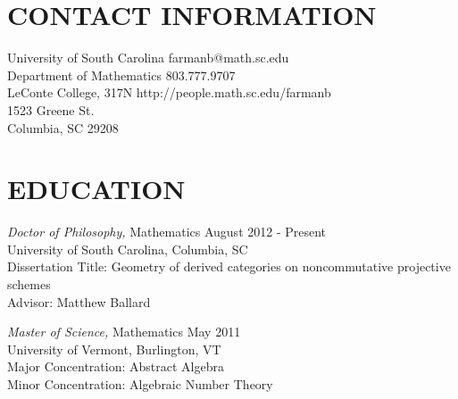 \documentclass[line,overlapped]{res}
\begin{document}

\begin{resume}
  
  
  \section{CONTACT INFORMATION}
  University of South Carolina \hfill farmanb@math.sc.edu\\
  Department of Mathematics \hfill 803.777.9707\\
  LeConte College, 317N \hfill http://people.math.sc.edu/farmanb\\
  1523 Greene St.\\
  Columbia, SC 29208
  
  \section{EDUCATION} 
          {\sl Doctor of Philosophy,} Mathematics \hfill August 2012 - Present\\
          University of South Carolina, Columbia, SC\\
          Dissertation Title: Geometry of derived categories on noncommutative projective schemes\\
          Advisor: Matthew Ballard

          {\sl Master of Science,} Mathematics \hfill May 2011\\
          University of Vermont, Burlington, VT\\
          Major Concentration: Abstract Algebra\\
          Minor Concentration: Algebraic Number Theory


\end{resume}
\end{document}
